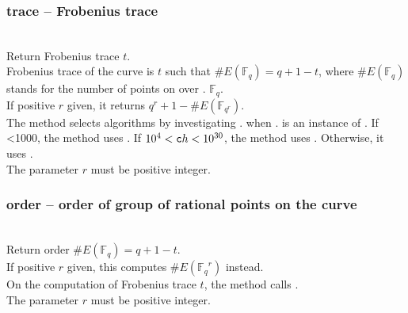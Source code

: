   \subsubsection{trace -- Frobenius trace}
   \\
   \spacing
   \quad Return Frobenius trace $t$.\\
   \spacing
   \quad Frobenius trace of the curve is $t$ such that $\#E(\mathbb{F}_q)=q+1-t$, where $\#E(\mathbb{F}_q)$ stands for the number of points on  over . $\mathbb{F}_q$. \\
   If positive $r$ given, it returns $q^r+1-\#E(\mathbb{F}_{q^r})$.\\
   \negok The method selects algorithms by investigating . when . is an instance of .
   If <1000, the method uses . 
   If $10^4<{\texttt ch}<10^{30}$, the method uses . 
   Otherwise, it uses .\\
   \spacing
   \quad The parameter $r$ must be positive integer.\\
%
  \subsubsection{order -- order of group of rational points on the curve}
   \\
   \spacing
   \quad Return order $\#E(\mathbb{F}_q)=q+1-t$. \\
   \spacing
   \quad If positive $r$ given, this computes $\#E({\mathbb{F}_q}^r)$ instead. \\
   \negok On the computation of Frobenius trace $t$, the method calls .\\
   \spacing
   \quad The parameter $r$ must be positive integer.\\
%
